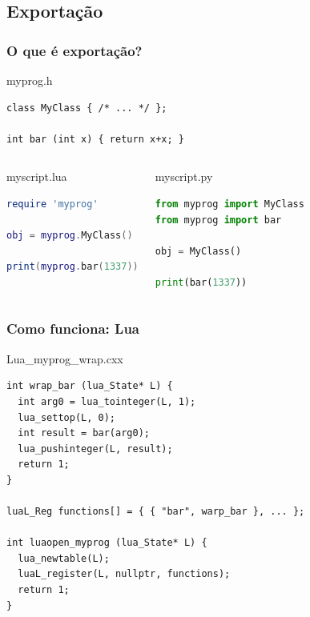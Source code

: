 \documentclass[brazil]{beamer}
\begin{document}
\subsection{Exportação}
\begin{frame}[fragile]
  \frametitle{O que é exportação?}
  \pause
  \begin{block}{myprog.h}
    \begin{lstlisting}
class MyClass { /* ... */ };

int bar (int x) { return x+x; }
    \end{lstlisting}
  \end{block}
  \pause
  \begin{columns}
      \begin{block}{myscript.lua}
        \begin{lstlisting}[language=lua]
require 'myprog'

obj = myprog.MyClass()

print(myprog.bar(1337))
        \end{lstlisting}
      \end{block}
    \pause
      \begin{block}{myscript.py}
        \begin{lstlisting}[language=python]
from myprog import MyClass
from myprog import bar

obj = MyClass()

print(bar(1337))
        \end{lstlisting}
      \end{block}
  \end{columns}
\end{frame}
\begin{frame}[fragile]
  \frametitle{Como funciona: Lua}
  \pause
  \begin{block}{Lua\_myprog\_wrap.cxx}
    \begin{lstlisting}
int wrap_bar (lua_State* L) {
  int arg0 = lua_tointeger(L, 1);
  lua_settop(L, 0);
  int result = bar(arg0);
  lua_pushinteger(L, result);
  return 1;
}

luaL_Reg functions[] = { { "bar", warp_bar }, ... };

int luaopen_myprog (lua_State* L) {
  lua_newtable(L);
  luaL_register(L, nullptr, functions);
  return 1;
}
    \end{lstlisting}
  \end{block}
\end{frame}
\end{document}
